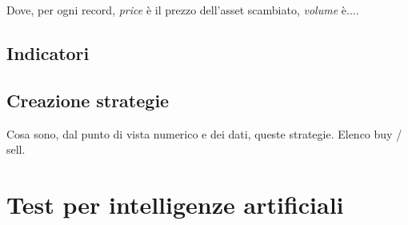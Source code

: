 \documentclass[a4paper,12pt]{report}
\begin{document}
Dove, per ogni record, \textit{price} è il prezzo dell'asset scambiato, \textit{volume} è....



\section{Indicatori}

\section{Creazione strategie}
Cosa sono, dal punto di vista numerico e dei dati, queste strategie. Elenco buy / sell.

\newpage
\chapter{Test per intelligenze artificiali}	
\label{cap4}
\end{document}
